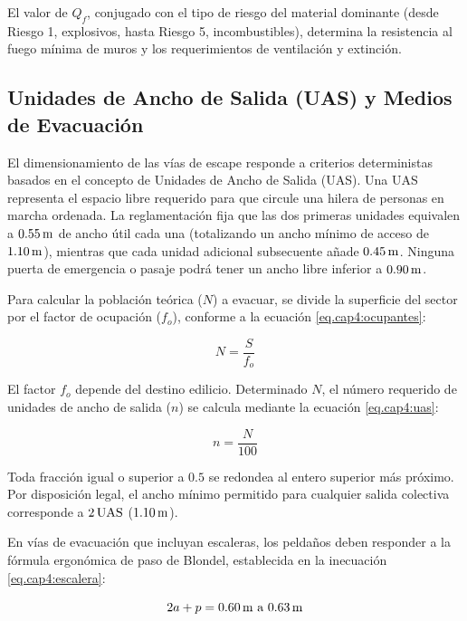 El valor de $Q_f$, conjugado con el tipo de riesgo del material dominante (desde Riesgo 1, explosivos, hasta Riesgo 5,
incombustibles), determina la resistencia al fuego mínima de muros y los requerimientos de ventilación y extinción.

\subsection{Unidades de Ancho de Salida (UAS) y Medios de Evacuación}

El dimensionamiento de las vías de escape responde a criterios deterministas basados en el concepto de Unidades de Ancho
de Salida (UAS). Una UAS representa el espacio libre requerido para que circule una hilera de personas en marcha
ordenada. La reglamentación fija que las dos primeras unidades equivalen a $0.55\,\mathrm{m}$ de ancho útil cada una (totalizando un
ancho mínimo de acceso de $1.10\,\mathrm{m}$), mientras que cada unidad adicional subsecuente añade $0.45\,\mathrm{m}$. Ninguna puerta de
emergencia o pasaje podrá tener un ancho libre inferior a $0.90\,\mathrm{m}$.

Para calcular la población teórica ($N$) a evacuar, se divide la superficie del sector por el factor de ocupación
($f_o$), conforme a la ecuación \ref{eq.cap4:ocupantes}:

\begin{equation}
\label{eq.cap4:ocupantes}
N = \frac{S}{f_o}
\end{equation}

El factor $f_o$ depende del destino edilicio. Determinado $N$, el número requerido de unidades de ancho de salida ($n$)
se calcula mediante la ecuación \ref{eq.cap4:uas}:

\begin{equation}
\label{eq.cap4:uas}
n = \frac{N}{100}
\end{equation}

Toda fracción igual o superior a $0.5$ se redondea al entero superior más próximo. Por disposición legal, el ancho
mínimo permitido para cualquier salida colectiva corresponde a $2\,\mathrm{UAS}$ ($1.10\,\mathrm{m}$).

En vías de evacuación que incluyan escaleras, los peldaños deben responder a la fórmula ergonómica de paso de Blondel,
establecida en la inecuación \ref{eq.cap4:escalera}:

\begin{equation}
\label{eq.cap4:escalera}
2a + p = 0.60\,\mathrm{m} \text{ a } 0.63\,\mathrm{m}
\end{equation}

